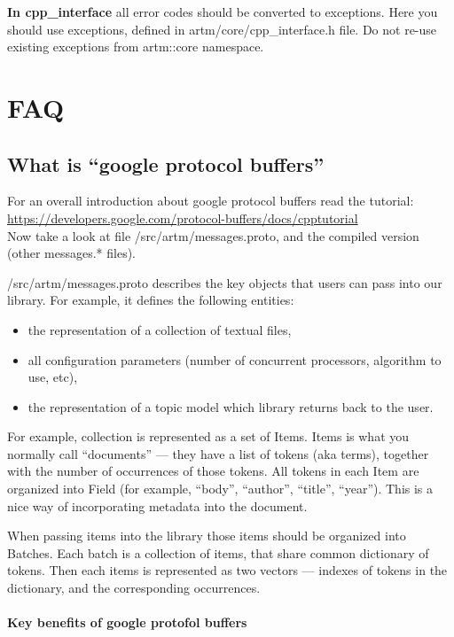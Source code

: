 \documentclass[11pt,a4paper,twoside]{report}
\begin{document}
\textbf{In cpp\_interface} all error codes should be converted to exceptions.
Here you should use exceptions, defined in artm/core/cpp\_interface.h file.
Do not re-use existing exceptions from artm::core namespace.

\section{FAQ}

\subsection{What is ``google protocol buffers''}

For an overall introduction about google protocol buffers read the tutorial: \\
\url{https://developers.google.com/protocol-buffers/docs/cpptutorial} \\
Now take a look at file /src/artm/messages.proto,
and the compiled version (other messages.* files).

/src/artm/messages.proto describes the key objects that users can pass into our library.
For example, it defines the following entities:
\begin{itemize}
    \item the representation of a collection of textual files,
    \item all configuration parameters (number of concurrent processors, algorithm to use, etc),
    \item the representation of a topic model which library returns back to the user.
 \end{itemize}

For example, collection is represented as a set of Items.
Items is what you normally call ``documents'' --- they have a list of tokens (aka terms),
together with the number of occurrences of those tokens.
All tokens in each Item are organized into Field (for example, ``body'', ``author'', ``title'', ``year'').
This is a nice way of incorporating metadata into the document.

When passing items into the library those items should be organized into Batches.
Each batch is a collection of items, that share common dictionary of tokens.
Then each items is represented as two vectors --- indexes of tokens in the dictionary,
and the corresponding occurrences.

\paragraph{Key benefits of google protofol buffers}
\end{document}
